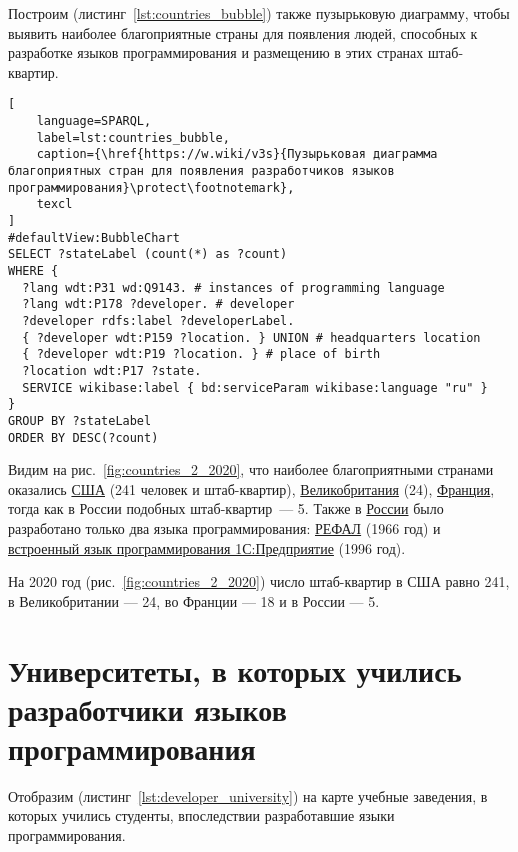 Построим (листинг~\ref{lst:countries_bubble}) также пузырьковую диаграмму, чтобы выявить наиболее благоприятные страны для появления людей, способных к разработке языков программирования и размещению в этих странах штаб-квартир. 
\begin{lstlisting}[
	language=SPARQL,
	label=lst:countries_bubble,
	caption={\href{https://w.wiki/v3s}{Пузырьковая диаграмма благоприятных стран для появления разработчиков языков программирования}\protect\footnotemark},
	texcl
]
#defaultView:BubbleChart
SELECT ?stateLabel (count(*) as ?count)
WHERE {
  ?lang wdt:P31 wd:Q9143. # instances of programming language
  ?lang wdt:P178 ?developer. # developer
  ?developer rdfs:label ?developerLabel. 
  { ?developer wdt:P159 ?location. } UNION # headquarters location
  { ?developer wdt:P19 ?location. } # place of birth
  ?location wdt:P17 ?state.
  SERVICE wikibase:label { bd:serviceParam wikibase:language "ru" } 	
}
GROUP BY ?stateLabel
ORDER BY DESC(?count)
\end{lstlisting}

Видим на рис.~\ref{fig:countries_2_2020}, что наиболее благоприятными странами оказались \href{https://en.wikipedia.org/wiki/USA}{США} (241 человек и штаб-квартир), \href{https://ru.wikipedia.org/wiki/Великобритания}{Великобритания} (24), \href{https://ru.wikipedia.org/wiki/Франция}{Франция}, тогда как в России подобных штаб-квартир~--- 5. Также в \href{https://en.wikipedia.org/wiki/Russia}{России} было разработано только два языка программирования: \href{https://www.wikidata.org/wiki/Q2626418}{РЕФАЛ} (1966 год) и \href{https://www.wikidata.org/wiki/Q65065977}{встроенный язык программирования 1С:Предприятие} (1996 год).

На 2020 год (рис.~\ref{fig:countries_2_2020}) число штаб-квартир в США равно 241, в Великобритании — 24, во Франции — 18 и в России — 5.

\section{Университеты, в которых учились разработчики языков программирования}
Отобразим (листинг~\ref{lst:developer_university}) на карте учебные заведения, в которых учились студенты, впоследствии разработавшие языки программирования.

